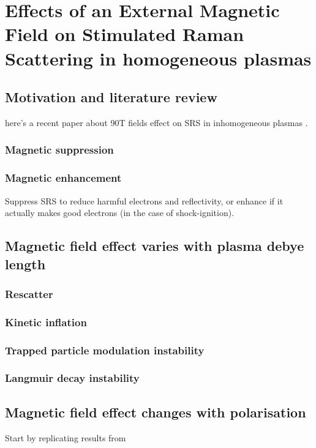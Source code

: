\chapter{Effects of an External Magnetic Field on Stimulated Raman Scattering in homogeneous plasmas}
\label{chp:magSRS}

\section{Motivation and literature review}

here's a recent paper about 90T fields effect on SRS in inhomogeneous plasmas \citep{Zhou2021}. 

\subsection{Magnetic suppression}
\subsection{Magnetic enhancement}
Suppress SRS to reduce harmful electrons and reflectivity, or enhance if it actually makes good electrons (in the case of shock-ignition).

\section{Magnetic field effect varies with plasma debye length}
\subsection{Rescatter}
\subsection{Kinetic inflation}
\subsection{Trapped particle modulation instability}
\subsection{Langmuir decay instability}

\section{Magnetic field effect changes with polarisation}

Start by replicating results from \cite{Winjum2018}



